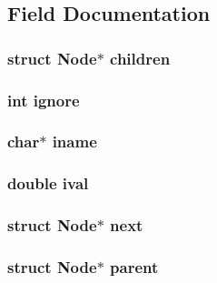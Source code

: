 \subsection{Field Documentation}
\hypertarget{struct_node_a827ac726d02ddf6d00ba8a55cd296df2}{
\subsubsection[{children}]{\setlength{\rightskip}{0pt plus 5cm}struct {\bf Node}$\ast$ children}}\label{struct_node_a827ac726d02ddf6d00ba8a55cd296df2}
\hypertarget{struct_node_a28a2a20ee60bdfbd168e4f4bf20d8c82}{
\subsubsection[{ignore}]{\setlength{\rightskip}{0pt plus 5cm}int ignore}}\label{struct_node_a28a2a20ee60bdfbd168e4f4bf20d8c82}
\hypertarget{struct_node_a76c70ae7ac3d58ebe41da968fedb8093}{
\subsubsection[{iname}]{\setlength{\rightskip}{0pt plus 5cm}char$\ast$ iname}}\label{struct_node_a76c70ae7ac3d58ebe41da968fedb8093}
\hypertarget{struct_node_ad7f9455e819b623c0e4a9480476eacfe}{
\subsubsection[{ival}]{\setlength{\rightskip}{0pt plus 5cm}double ival}}\label{struct_node_ad7f9455e819b623c0e4a9480476eacfe}
\hypertarget{struct_node_aa162dd1e0693188a22b1f13b9a2a0ef0}{
\subsubsection[{next}]{\setlength{\rightskip}{0pt plus 5cm}struct {\bf Node}$\ast$ next}}\label{struct_node_aa162dd1e0693188a22b1f13b9a2a0ef0}
\hypertarget{struct_node_a7b739036012f282683e6452a0b1595af}{
\subsubsection[{parent}]{\setlength{\rightskip}{0pt plus 5cm}struct {\bf Node}$\ast$ parent}}\label{struct_node_a7b739036012f282683e6452a0b1595af}
